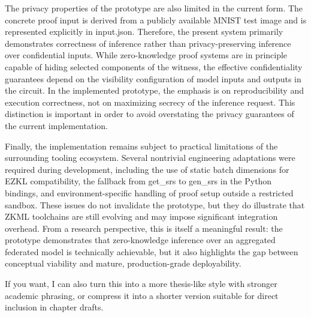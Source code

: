 The privacy properties of the prototype are also limited in the current form. The concrete proof input is derived from a publicly available MNIST test image and is represented explicitly in input.json. Therefore, the present system primarily demonstrates correctness of inference rather than privacy-preserving inference over confidential inputs. While zero-knowledge proof systems are in principle capable of hiding selected components of the witness, the effective confidentiality guarantees depend on the visibility configuration of model inputs and outputs in the circuit. In the implemented prototype, the emphasis is on reproducibility and execution correctness, not on maximizing secrecy of the inference request. This distinction is important in order to avoid overstating the privacy guarantees of the current implementation.

Finally, the implementation remains subject to practical limitations of the surrounding tooling ecosystem. Several nontrivial engineering adaptations were required during development, including the use of static batch dimensions for EZKL compatibility, the fallback from get_srs to gen_srs in the Python bindings, and environment-specific handling of proof setup outside a restricted sandbox. These issues do not invalidate the prototype, but they do illustrate that ZKML toolchains are still evolving and may impose significant integration overhead. From a research perspective, this is itself a meaningful result: the prototype demonstrates that zero-knowledge inference over an aggregated federated model is technically achievable, but it also highlights the gap between conceptual viability and mature, production-grade deployability.

If you want, I can also turn this into a more thesis-like style with stronger academic phrasing, or compress it into a shorter version suitable for direct inclusion in chapter drafts.